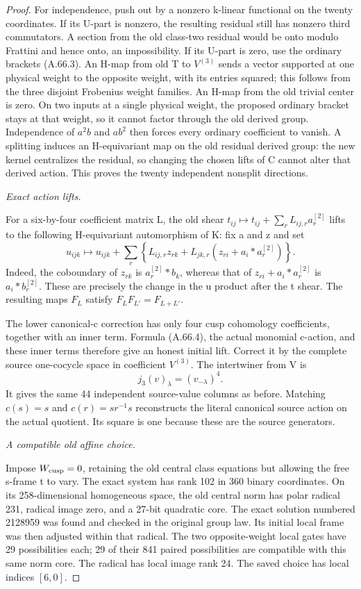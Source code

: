 \begin{proof}
For independence, push out by a nonzero k-linear functional on
the twenty coordinates. If its U-part is nonzero, the resulting
residual still has nonzero third commutators. A section from the
old class-two residual would be onto modulo Frattini and hence
onto, an impossibility. If its U-part is zero, use the ordinary
brackets (A.66.3). An H-map from old T to \(V^{(3)}\) sends a
vector supported at one physical weight to the opposite weight,
with its entries squared; this follows from the three disjoint
Frobenius weight families. An H-map from the old trivial center
is zero. On two inputs at a single physical weight, the proposed
ordinary bracket stays at that weight, so it cannot factor through
the old derived group. Independence of \(a^2b\) and \(ab^2\)
then forces every ordinary coefficient to vanish. A splitting induces an
H-equivariant map on the old residual derived group: the new
kernel centralizes the residual, so changing the chosen lifts
of C cannot alter that derived action. This proves the
twenty independent nonsplit directions.

\emph{Exact action lifts.}\par
For a six-by-four coefficient matrix L, the old shear
\(t_{ij}\mapsto t_{ij}+\sum_rL_{ij,r}a_r^{[2]}\) lifts to the
following H-equivariant automorphism of K: fix a and z and set
\[
 u_{ijk}\longmapsto u_{ijk}
   +\sum_r\left\{L_{ij,r}z_{rk}
        +L_{jk,r}(z_{ri}+a_i*a_r^{[2]})\right\}.
 \tag{A.66.4}
\]
Indeed, the coboundary of \(z_{rk}\) is \(a_r^{[2]}*b_k\),
whereas that of \(z_{ri}+a_i*a_r^{[2]}\) is
\(a_i*b_r^{[2]}\). These are precisely the change in the
u product after the t shear. The resulting maps \(F_L\)
satisfy \(F_LF_{L'}=F_{L+L'}\).

The lower canonical-c correction has only four cusp cohomology
coefficients, together with an inner term. Formula (A.66.4),
the actual monomial c-action, and these inner terms therefore
give an honest initial lift. Correct it by the complete source
one-cocycle space in coefficient \(V^{(3)}\). The intertwiner
from V is
\[
 j_3(v)_\lambda=(v_{-\lambda})^4.
 \tag{A.66.5}
\]
It gives the same 44 independent source-value columns as before.
Matching \(c(s)=s\) and \(c(r)=sr^{-1}s\) reconstructs the
literal canonical source action on the actual quotient. Its
square is one because these are the source generators.

\emph{A compatible old affine choice.}\par
Impose \(W_{\rm cusp}=0\), retaining the old central class
equations but allowing the free s-frame t to vary. The exact
system has rank 102 in 360 binary coordinates. On its
258-dimensional homogeneous space, the old central norm has
polar radical 231, radical image zero, and a 27-bit quadratic
core. The exact solution numbered 2128959 was found and checked
in the original group law. Its initial local frame was then
adjusted within that radical. The two opposite-weight local gates
have 29 possibilities each; 29 of their 841 paired possibilities
are compatible with this same norm core. The radical has local
image rank 24. The saved choice has local indices \([6,0]\).


\end{proof}
